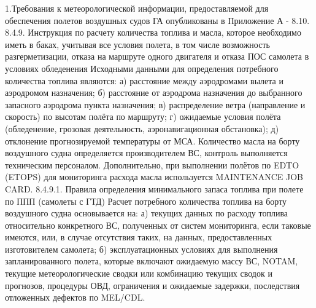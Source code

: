 1.Требования к метеорологической информации, предоставляемой для обеспечения полетов воздушных судов ГА опубликованы в Приложение А - 8.10.
8.4.9. Инструкция по расчету количества топлива и масла, которое необходимо иметь в баках, учитывая все условия полета, в том числе возможность разгерметизации, отказа на маршруте одного двигателя и отказа ПОС самолета в условиях обледенения
Исходными данными для определения потребного количества топлива являются: 
а)	расстояние между аэродромами вылета и аэродромом назначения; 
б)	расстояние от аэродрома назначения до выбранного запасного аэродрома пункта назначения; 
в)	распределение ветра (направление и скорость) по высотам полёта по маршруту; 
г)	ожидаемые условия полёта (обледенение, грозовая деятельность, аэронавигационная обстановка); 
д)	отклонение прогнозируемой температуры от МСА. 
Количество масла на борту воздушного судна определяется производителем ВС, контроль выполняется техническим персоналом. Дополнительно, при выполнении полётов по EDTO (ETOPS) для мониторинга расхода масла используется MAINTENANCE JOB CARD.
8.4.9.1. Правила определения минимального запаса топлива при полете по ППП (самолеты с ГТД)
Расчет потребного количества топлива на борту воздушного судна основывается на:
а)	текущих данных по расходу топлива относительно конкретного ВС, полученных от систем мониторинга, если таковые имеются, или, в случае отсутствия таких, на данных, предоставленных изготовителем самолета; 
б)	эксплуатационных условиях для выполнения запланированного полета, которые включают ожидаемую массу ВС, NOTAM, текущие метеорологические сводки или комбинацию текущих сводок и прогнозов, процедуры ОВД, ограничения и ожидаемые задержки, последствия отложенных дефектов по MEL/CDL. 

